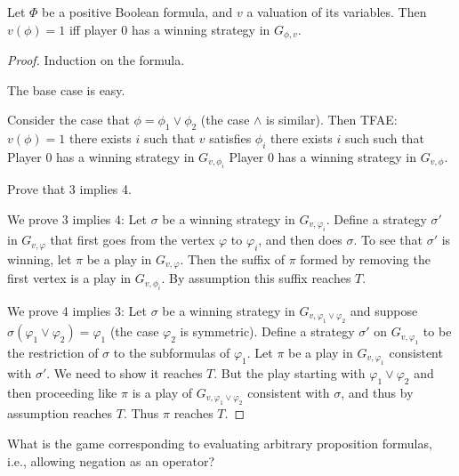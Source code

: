 \documentclass[a4paper,10pt]{article}
\newcommand{\pz}{Player $0$\xspace}
\begin{document}
\begin{theorem}
Let $\Phi$ be a positive Boolean formula, and $v$ a valuation of its variables.
Then $v(\phi) = 1$ iff player $0$ has a winning strategy in 
$G_{\phi,v}$.
\end{theorem}

\begin{proof}
Induction on the formula. 

The base case is easy.

Consider the case that $\phi = \phi_1 \vee \phi_2$ (the case $\wedge$ is similar). Then TFAE:
\en
\- $v(\phi) = 1$ 
\- there exists $i$ such that $v$ satisfies $\phi_i$ 
\- there exists $i$ such such that \pz has a winning strategy in $G_{v,\phi_i}$ 
\- \pz has a winning strategy in $G_{v,\phi}$.
\ne

\begin{question}
 Prove that 3 implies 4.
\end{question}

We prove 3 implies 4: Let $\sigma$ be a winning strategy in $G_{v,\varphi_i}$. Define a strategy $\sigma'$ in $G_{v,\varphi}$ that first goes from the vertex $\varphi$ to $\varphi_i$, and then does $\sigma$. To see that $\sigma'$ is winning, let $\pi$ be a play in $G_{v,\varphi}$. Then the suffix of $\pi$ formed by removing the first vertex is a play in $G_{v,\phi_i}$. By assumption this suffix reaches $T$.

We prove 4 implies 3: Let $\sigma$ be a winning strategy in $G_{v,\varphi_1 \vee \varphi_2}$ and suppose 
$\sigma(\varphi_1 \vee \varphi_2) = \varphi_1$ (the case $\varphi_2$ is 
symmetric). 
Define a strategy $\sigma'$ on $G_{v,\varphi_1}$ to be the restriction of $\sigma$ to the 
subformulas of $\varphi_1$.
Let $\pi$ be a play in $G_{v,\varphi_1}$ consistent with $\sigma'$. We need to 
show it reaches $T$. But the play starting with $\varphi_1 \vee \varphi_2$ and 
then proceeding like $\pi$ is a play of $G_{v, \varphi_1 \vee \varphi_2}$ 
consistent with $\sigma$, and thus by assumption reaches $T$. Thus $\pi$ 
reaches $T$.
\end{proof}





\begin{question} What is the game corresponding to evaluating arbitrary proposition 
formulas, i.e., allowing negation as an operator? 
\end{question}
\end{document}
